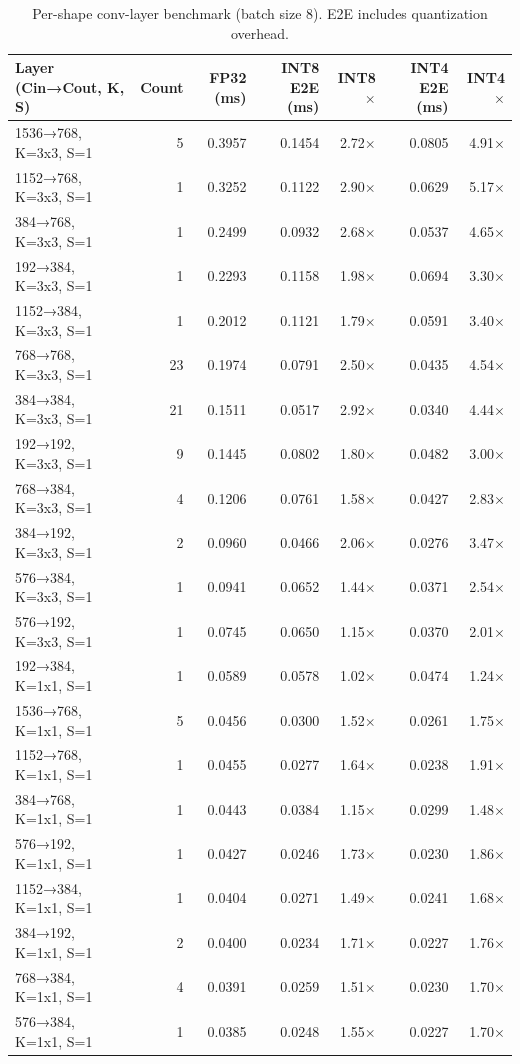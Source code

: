 \begin{table}[htbp]
\centering
\small
\caption{Per-shape conv-layer benchmark (batch size 8). E2E includes quantization overhead.}
\label{tab:conv_layer}
\begin{tabular}{lrrrrrr}
\toprule
Layer (Cin→Cout, K, S) & Count & FP32 (ms) & INT8 E2E (ms) & INT8 $\times$ & INT4 E2E (ms) & INT4 $\times$ \\
\midrule
1536→768, K=3x3, S=1 & 5 & 0.3957 & 0.1454 & 2.72$\times$ & 0.0805 & 4.91$\times$ \\
1152→768, K=3x3, S=1 & 1 & 0.3252 & 0.1122 & 2.90$\times$ & 0.0629 & 5.17$\times$ \\
384→768, K=3x3, S=1 & 1 & 0.2499 & 0.0932 & 2.68$\times$ & 0.0537 & 4.65$\times$ \\
192→384, K=3x3, S=1 & 1 & 0.2293 & 0.1158 & 1.98$\times$ & 0.0694 & 3.30$\times$ \\
1152→384, K=3x3, S=1 & 1 & 0.2012 & 0.1121 & 1.79$\times$ & 0.0591 & 3.40$\times$ \\
768→768, K=3x3, S=1 & 23 & 0.1974 & 0.0791 & 2.50$\times$ & 0.0435 & 4.54$\times$ \\
384→384, K=3x3, S=1 & 21 & 0.1511 & 0.0517 & 2.92$\times$ & 0.0340 & 4.44$\times$ \\
192→192, K=3x3, S=1 & 9 & 0.1445 & 0.0802 & 1.80$\times$ & 0.0482 & 3.00$\times$ \\
768→384, K=3x3, S=1 & 4 & 0.1206 & 0.0761 & 1.58$\times$ & 0.0427 & 2.83$\times$ \\
384→192, K=3x3, S=1 & 2 & 0.0960 & 0.0466 & 2.06$\times$ & 0.0276 & 3.47$\times$ \\
576→384, K=3x3, S=1 & 1 & 0.0941 & 0.0652 & 1.44$\times$ & 0.0371 & 2.54$\times$ \\
576→192, K=3x3, S=1 & 1 & 0.0745 & 0.0650 & 1.15$\times$ & 0.0370 & 2.01$\times$ \\
192→384, K=1x1, S=1 & 1 & 0.0589 & 0.0578 & 1.02$\times$ & 0.0474 & 1.24$\times$ \\
1536→768, K=1x1, S=1 & 5 & 0.0456 & 0.0300 & 1.52$\times$ & 0.0261 & 1.75$\times$ \\
1152→768, K=1x1, S=1 & 1 & 0.0455 & 0.0277 & 1.64$\times$ & 0.0238 & 1.91$\times$ \\
384→768, K=1x1, S=1 & 1 & 0.0443 & 0.0384 & 1.15$\times$ & 0.0299 & 1.48$\times$ \\
576→192, K=1x1, S=1 & 1 & 0.0427 & 0.0246 & 1.73$\times$ & 0.0230 & 1.86$\times$ \\
1152→384, K=1x1, S=1 & 1 & 0.0404 & 0.0271 & 1.49$\times$ & 0.0241 & 1.68$\times$ \\
384→192, K=1x1, S=1 & 2 & 0.0400 & 0.0234 & 1.71$\times$ & 0.0227 & 1.76$\times$ \\
768→384, K=1x1, S=1 & 4 & 0.0391 & 0.0259 & 1.51$\times$ & 0.0230 & 1.70$\times$ \\
576→384, K=1x1, S=1 & 1 & 0.0385 & 0.0248 & 1.55$\times$ & 0.0227 & 1.70$\times$ \\
\bottomrule
\end{tabular}
\end{table}

